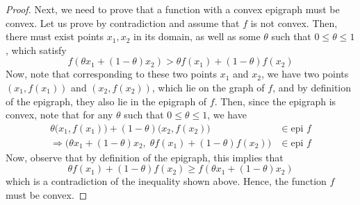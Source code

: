 \documentclass[a4paper]{article}
\theoremstyle{definition}
\begin{document}
\begin{proof}
	Next, we need to prove that a function with a convex epigraph must be convex.
	Let us prove by contradiction and assume that $f$ is not convex.
	Then, there must exist points $x_1, x_2$ in its domain, as well as some $\theta$ such that $0 \leq \theta \leq 1$, which satisfy
	\begin{equation*}
		f(\theta x_1 + (1 - \theta) x_2) > \theta f(x_1) + (1 - \theta) f(x_2)
	\end{equation*}
	Now, note that corresponding to these two points $x_1$ and $x_2$, we have two points $(x_1, f(x_1))$ and $(x_2, f(x_2))$, which lie on the graph of $f$, and by definition of the epigraph, they also lie in the epigraph of $f$.
	Then, since the epigraph is convex, note that for any $\theta$ such that $0 \leq \theta \leq 1$, we have
	\begin{align*}
		\theta \big( x_1, f(x_1) \big) + (1 - \theta) \big( x_2, f(x_2) \big) & \in \text{epi } f \\
		\Rightarrow \big( \theta x_1 + (1 - \theta) x_2, \; \theta f(x_1) + (1 - \theta) f(x_2) \big) & \in \text{epi } f
	\end{align*}
	Now, observe that by definition of the epigraph, this implies that
	\begin{equation*}
		\theta f(x_1) + (1 - \theta) f(x_2) \geq f(\theta x_1 + (1 - \theta) x_2)
	\end{equation*}
	which is a contradiction of the inequality shown above.
	Hence, the function $f$ must be convex.
\end{proof}
\end{document}
